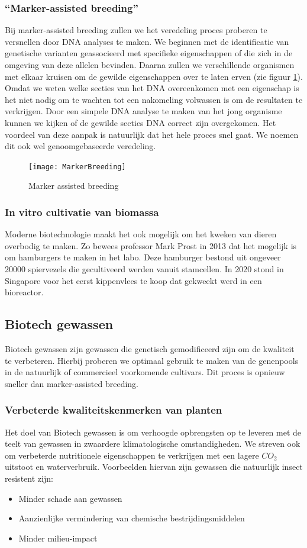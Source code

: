 \documentclass[a4paper,kul]{kulakarticle} %
\begin{document}
\subsubsection{“Marker-assisted breeding”}
Bij marker-assisted breeding zullen we het veredeling proces proberen te versnellen door DNA analyses te maken. We beginnen met de identificatie van genetische varianten geassocieerd met specifieke eigenschappen of die zich in de omgeving van deze allelen bevinden. Daarna zullen we verschillende organismen met elkaar kruisen om de gewilde eigenschappen over te laten erven (zie figuur \ref{fig:markerbreeding}). Omdat we weten welke secties van het DNA overeenkomen met een eigenschap is het niet nodig om te wachten tot een nakomeling volwassen is om de resultaten te verkrijgen. Door een simpele DNA analyse te maken van het jong organisme kunnen we kijken of de gewilde secties DNA correct zijn overgekomen. Het voordeel van deze aanpak is natuurlijk dat het hele proces snel gaat. We noemen dit ook wel genoomgebaseerde veredeling. 
\begin{figure}[h]
	\centering
	\texttt{[image: MarkerBreeding]}
	\caption[Marker assisted breeding]{Marker assisted breeding}
	\label{fig:markerbreeding}
\end{figure}
\subsubsection{In vitro cultivatie van biomassa} 
Moderne biotechnologie maakt het ook mogelijk om het kweken van dieren overbodig te maken. Zo bewees professor Mark Prost in 2013 dat het mogelijk is om hamburgers te maken in het labo. Deze hamburger bestond uit ongeveer \num{20000} spiervezels die gecultiveerd werden vanuit stamcellen. In 2020 stond in Singapore voor het eerst kippenvlees te koop dat gekweekt werd in een bioreactor. 
\subsection{Biotech gewassen}
Biotech gewassen zijn gewassen die genetisch gemodificeerd zijn om de kwaliteit te verbeteren. Hierbij proberen we optimaal gebruik te maken van de genenpools in de natuurlijk of commercieel voorkomende cultivars. Dit proces is opnieuw sneller dan marker-assisted breeding. 
\subsubsection{Verbeterde kwaliteitskenmerken van planten}
Het doel van Biotech gewassen is om verhoogde opbrengsten op te leveren met de teelt van gewassen in zwaardere klimatologische omstandigheden. We streven ook om verbeterde nutritionele eigenschappen te verkrijgen met een lagere $CO_2$ uitstoot en waterverbruik. Voorbeelden hiervan zijn gewassen die natuurlijk insect resistent zijn:
\begin{itemize}
	\item Minder schade aan gewassen
	\item Aanzienlijke vermindering van chemische bestrijdingsmiddelen
	\item Minder milieu-impact
\end{itemize}
\end{document}

